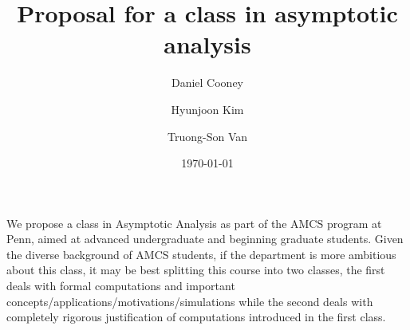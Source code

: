 \documentclass[12pt]{amsart}
\title{ Proposal for a class in asymptotic analysis }
\author{Daniel Cooney}
\author{Hyunjoon Kim}
\author{Truong-Son Van}
\date{\today}
\begin{document}
\maketitle

We propose a class in Asymptotic Analysis as part of the AMCS program at Penn,
aimed at advanced undergraduate and beginning graduate students.
Given the diverse background of AMCS students,
if the department is more ambitious about this class, it may be best splitting 
this course into two classes, the first deals with formal computations 
and important concepts/applications/motivations/simulations while the second
deals with completely rigorous justification of computations introduced in the
first class.





\printbibliography 
%
%
\end{document}
